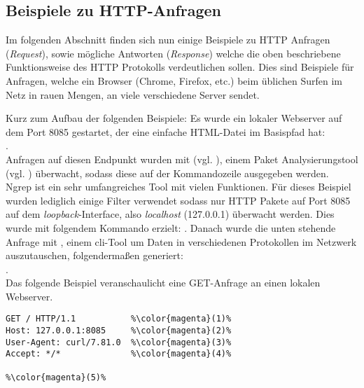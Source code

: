 \subsection{Beispiele zu HTTP-Anfragen}
Im folgenden Abschnitt finden sich nun einige Beispiele zu HTTP Anfragen (\textit{Request}), sowie mögliche Antworten (\textit{Response}) welche die oben beschriebene Funktionsweise des HTTP Protokolls verdeutlichen sollen. Dies sind Beispiele für Anfragen, welche ein Browser (Chrome, Firefox, etc.) beim üblichen Surfen im Netz in rauen Mengen, an viele verschiedene Server sendet.\bigskip

\noindent
Kurz zum Aufbau der folgenden Beispiele: Es wurde ein lokaler Webserver auf dem Port 8085 gestartet, der eine einfache HTML-Datei im Basispfad hat:\\ .\\ Anfragen auf diesen Endpunkt wurden mit  (vgl. \cite{wiki:ngrep}), einem Paket Analysierungstool (vgl. \cite{wiki:packet-analyzer}) überwacht, sodass diese auf der Kommandozeile ausgegeben werden.\\ Ngrep ist ein sehr umfangreiches Tool mit vielen Funktionen. Für dieses Beispiel wurden lediglich einige Filter verwendet sodass nur HTTP Pakete auf Port 8085 auf dem \textit{loopback}-Interface, also \textit{localhost} (127.0.0.1) überwacht werden. Dies wurde mit folgendem Kommando erzielt: . 
Danach wurde die unten stehende Anfrage mit , einem \acrshort{cli}-Tool um Daten in verschiedenen Protokollen im Netzwerk auszutauschen, folgendermaßen generiert:\\ .
\newpage
\noindent
\ColorfulCodeDisclaimer{}\\
Das folgende Beispiel veranschaulicht eine GET-Anfrage an einen lokalen Webserver.
\begin{lstlisting}[style=goMono,caption={Bespiel 1: Demonstration der GET-Methode},label={lst:http:ex1}]
GET / HTTP/1.1           %\color{magenta}(1)%
Host: 127.0.0.1:8085     %\color{magenta}(2)%
User-Agent: curl/7.81.0  %\color{magenta}(3)%
Accept: */*              %\color{magenta}(4)%

%\color{magenta}(5)%
\end{lstlisting}

